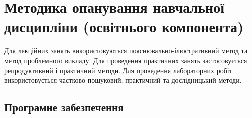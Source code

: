 \documentclass{Syllabus}
\begin{document}

\printbibliography[category=LabPract, heading=subbibliography, title={Лабораторний практикум}]

\clearpage
{}

\section{Методика опанування навчальної дисципліни (освітнього компонента)}

Для лекційних занять використовуються пояснювально‐ілюстративний метод та метод проблемного викладу. Для проведення практичних занять застосовується репродуктивний і практичний методи. Для проведення лабораторних робіт використовується частково‐пошуковий, практичний та дослідницький методи.


\subsection*{Програмне забезпечення}
\end{document}
